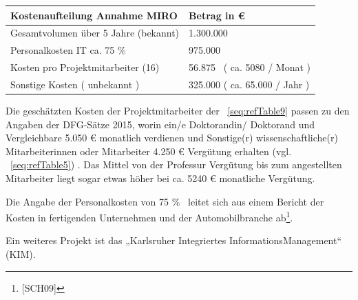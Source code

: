 \documentclass[a4paper]{article}
\begin{document}
\begin{center}
\label{seq:refTable9}\tablefirsthead{}
\tablehead{}
\tabletail{}
\tablelasttail{}
\begin{supertabular}{|m{7.046cm}|m{5.063cm}|}
\hline
{\sffamily\bfseries\color{black} Kostenaufteilung Annahme MIRO} &
{\sffamily\bfseries\color{black} Betrag in €}\\\hline
{\sffamily\color{black} Gesamtvolumen über 5 Jahre (bekannt)} &
{\sffamily\color{black} 1.300.000}\\\hline
{\sffamily\color{black} Personalkosten IT ca. 75 \%} &
{\sffamily\color{black} 975.000}\\\hline
{\sffamily\color{black} Kosten pro Projektmitarbeiter (16)} &
{\sffamily\color{black} 56.875 \ ( ca. 5080 / Monat )}\\\hline
{\sffamily\color{black} Sonstige Kosten ( unbekannt )} &
{\sffamily\color{black} 325.000 ( ca. 65.000 / Jahr )}\\\hline
\end{supertabular}
\end{center}
{\sffamily
Die geschätzten Kosten der Projektmitarbeiter der \tablename~\ref{seq:refTable9} passen zu den Angaben der DFG-Sätze
2015, worin ein/e Doktorandin/ Doktorand und Vergleichbare 5.050 € monatlich verdienen und Sonstige(r)
wissenschaftliche(r) Mitarbeiterinnen oder Mitarbeiter 4.250 € Vergütung erhalten (vgl. \tablename~\ref{seq:refTable5})
. Das Mittel von der Professur Vergütung bis zum angestellten Mitarbeiter liegt sogar etwas höher bei ca. 5240 €
monatliche Vergütung\textcolor{red}{.}}


\bigskip

{\sffamily
Die Angabe der Personalkosten von 75 \% \ leitet sich aus einem Bericht der Kosten in fertigenden Unternehmen und der
Automobilbranche ab\footnote{[SCH09]}. }


\bigskip

{\sffamily
Ein weiteres Projekt ist das „Karlsruher Integriertes InformationsManagement“ (KIM).}
\end{document}
